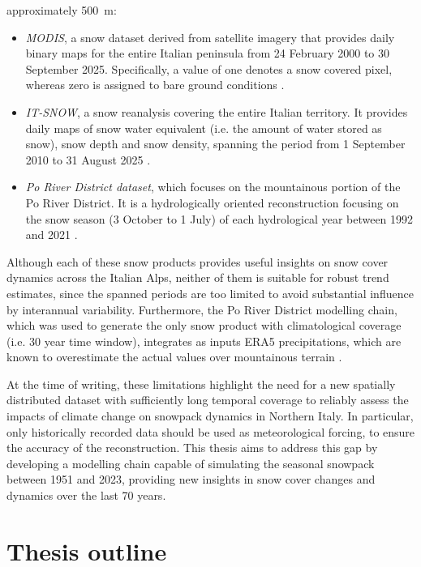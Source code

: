 approximately \SI{500}{\meter}: 
\begin{itemize}[label=$\blacktriangleright$]
    \item \textit{MODIS}, a snow dataset derived from satellite imagery that provides daily binary maps for the entire Italian peninsula 
    from 24 February 2000 to 30 September 2025. Specifically, a value of one denotes a snow covered pixel, whereas zero is assigned 
    to bare ground conditions \parencite{MODIS_ITA}.
    \item \textit{IT-SNOW}, a snow reanalysis covering the entire Italian territory. It provides daily maps of snow water equivalent 
    (i.e. the amount of water stored as snow), snow depth and snow density, spanning the period from 1 September 2010 to 31 August 
    2025 \parencite{IT-SNOW}.
    \item \textit{Po River District dataset}, which focuses on the mountainous portion of the Po River District. It is a 
    hydrologically oriented reconstruction focusing on the snow season (3 October to 1 July) of each hydrological year between 
    1992 and 2021 \parencite{Po_River_District_dataset}.
\end{itemize}
Although each of these snow products provides useful insights on snow cover dynamics across the Italian Alps, neither of them is 
suitable for robust trend estimates, since the spanned periods are too limited to avoid substantial influence by interannual 
variability. Furthermore, the Po River District modelling chain, which was used to generate the only snow product with climatological 
coverage (i.e. 30 year time window), integrates as inputs ERA5 precipitations, which are known to overestimate the actual values 
over mountainous terrain \parencite{ERA5_bias}. 

At the time of writing, these limitations highlight the need for a new spatially distributed dataset with sufficiently long 
temporal coverage to reliably assess the impacts of climate change on snowpack dynamics in Northern Italy. In 
particular, only historically recorded data should be used as meteorological forcing, to ensure the accuracy  
of the reconstruction. This thesis aims to address this gap by developing a modelling chain capable of simulating the seasonal snowpack 
between 1951 and 2023, providing new insights in snow cover changes and dynamics over the last \num{70} years.








\section{Thesis outline}

